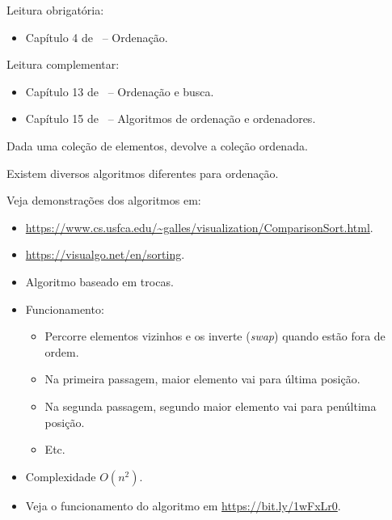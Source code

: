 \newcommand{\defs}{../defs}


\newcommand{\content}{Ordenação de estruturas lineares}
\newcommand{\class}{Algoritmos e Estruturas de Dados}
\newcommand{\shortcourse}{45EST}



\makeheader

{
Leitura obrigatória:
\begin{itemize}
	\item Capítulo 4 de~\cite{Ziviani2010} -- Ordenação.
\end{itemize}

Leitura complementar:
\begin{itemize}
	\item Capítulo 13 de~\cite{Pereira2008} -- Ordenação e busca.
	\item Capítulo 15 de~\cite{Preiss2001} -- Algoritmos de ordenação e ordenadores.
\end{itemize}
}

\medskip


\begin{itemize}
	\item Dada uma coleção de elementos, devolve a coleção ordenada.
	
	{\color{redtext}
	\item Existem diversos algoritmos diferentes para ordenação.
	\item Veja demonstrações dos algoritmos em:
	{\fontsize{9pt}{4pt}
	\begin{itemize}
		\item \url{https://www.cs.usfca.edu/~galles/visualization/ComparisonSort.html}.
		\item \url{https://visualgo.net/en/sorting}.
	\end{itemize}
	}}
\end{itemize}

\medskip


\begin{itemize}
	\item Algoritmo baseado em trocas.
	\item Funcionamento:
	\begin{itemize}
		\item Percorre elementos vizinhos e os inverte (\textit{swap}) quando estão fora de ordem.
		\item Na primeira passagem, maior elemento vai para última posição.
		\item Na segunda passagem, segundo maior elemento vai para penúltima posição.
		\item Etc.
	\end{itemize}
	\item Complexidade $O(n^2)$.
	\item Veja o funcionamento do algoritmo em \url{https://bit.ly/1wFxLr0}.
\end{itemize}

